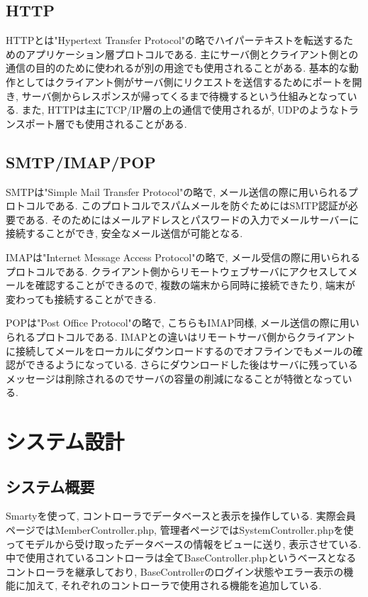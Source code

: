 \documentclass[submit,techrep]{ipsj}
\begin{document}
\subsection{HTTP}
HTTPとは"Hypertext Transfer Protocol"の略でハイパーテキストを転送するためのアプリケーション層プロトコルである. 
主にサーバ側とクライアント側との通信の目的のために使われるが別の用途でも使用されることがある. 基本的な動作としてはクライアント側がサーバ側にリクエストを送信するためにポートを開き, サーバ側からレスポンスが帰ってくるまで待機するという仕組みとなっている. 
また, HTTPは主にTCP/IP層の上の通信で使用されるが, UDPのようなトランスポート層でも使用されることがある. 

\subsection{SMTP/IMAP/POP}
SMTPは"Simple Mail Transfer Protocol"の略で, メール送信の際に用いられるプロトコルである.
このプロトコルでスパムメールを防ぐためにはSMTP認証が必要である. そのためにはメールアドレスとパスワードの入力でメールサーバーに接続することができ, 安全なメール送信が可能となる. 

IMAPは"Internet Message Access Protocol"の略で, メール受信の際に用いられるプロトコルである.
クライアント側からリモートウェブサーバにアクセスしてメールを確認することができるので, 複数の端末から同時に接続できたり, 端末が変わっても接続することができる.

POPは"Post Office Protocol"の略で, こちらもIMAP同様, メール送信の際に用いられるプロトコルである. 
IMAPとの違いはリモートサーバ側からクライアントに接続してメールをローカルにダウンロードするのでオフラインでもメールの確認ができるようになっている. さらにダウンロードした後はサーバに残っているメッセージは削除されるのでサーバの容量の削減になることが特徴となっている.

\section{システム設計}
\subsection{システム概要}
Smartyを使って, コントローラでデータベースと表示を操作している. 実際会員ページではMemberController.php, 管理者ページではSystemController.phpを使ってモデルから受け取ったデータベースの情報をビューに送り, 表示させている.  
中で使用されているコントローラは全てBaseController.phpというベースとなるコントローラを継承しており, BaseControllerのログイン状態やエラー表示の機能に加えて, それぞれのコントローラで使用される機能を追加している. 
\end{document}
